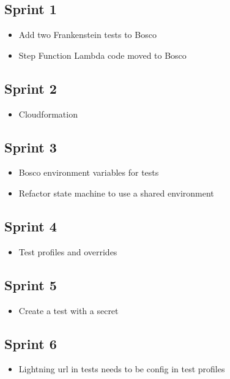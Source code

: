 \documentclass[12pt,a4paper,titlepage]{report}
\begin{document}
\subsection*{Sprint 1}
\begin{itemize}
\item Add two Frankenstein tests to Bosco
\item Step Function Lambda code moved to Bosco
\end{itemize}

\subsection*{Sprint 2}
\begin{itemize}
\item Cloudformation
\end{itemize}

\subsection*{Sprint 3}
\begin{itemize}
\item Bosco environment variables for tests
\item Refactor state machine to use a shared environment
\end{itemize}

\subsection*{Sprint 4}
\begin{itemize}
\item Test profiles and overrides
\end{itemize}

\subsection*{Sprint 5}
\begin{itemize}
\item Create a test with a secret
\end{itemize}

\subsection*{Sprint 6}
\begin{itemize}
\item Lightning url in tests needs to be config in test profiles
\end{itemize}
\end{document}
